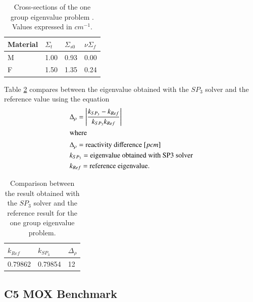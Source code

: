 \documentclass{anstrans}
\begin{document}
\begin{table}[htbp!]
	\centering
	\caption{Cross-sections of the one group eigenvalue problem \cite{brantley_simplifiedP3_2000}. Values expressed in $cm^{-1}$.}
	\label{tab:cross-sections}
	\begin{tabular}{llll}
	\toprule
	Material	& $\Sigma_t$ & $\Sigma_{s0}$ & $\nu\Sigma_f$ \\
	\midrule
	M 			& 1.00		& 0.93			& 0.00			\\
	F 			& 1.50		& 1.35			& 0.24			\\
	\bottomrule
	\end{tabular}
\end{table}

Table \ref{tab:keff-1st} compares between the eigenvalue obtained with the $SP_3$ solver and the reference value \cite{brantley_simplifiedP3_2000} using the equation
\begin{align}
  & \Delta_\rho = \left| \frac{k_{SP_3}-k_{Ref}}{k_{SP_3} k_{Ref}} \right| \label{eq:delta-rho} \\
  \intertext{where}
  & \Delta_\rho = \mbox{reactivity difference } [pcm] \notag \\
  & k_{SP_3} = \mbox{eigenvalue obtained with SP3 solver} \notag \\
  & k_{Ref} = \mbox{reference eigenvalue.} \notag
\end{align}

\begin{table}[htbp!]
	\centering
	\caption{Comparison between the result obtained with the $SP_3$ solver and the reference result for the one group eigenvalue problem.}
	\label{tab:keff-1st}
	\begin{tabular}{lll}
	\toprule
		$k_{Ref}$	& $k_{SP_3}$ 	& $\Delta_{\rho}$	\\
	\midrule
	 	0.79862		& 0.79854		& 12				\\
	\bottomrule
	\end{tabular}
\end{table}


\subsection{C5 MOX Benchmark}
\label{sec:results-2nd}
\end{document}
